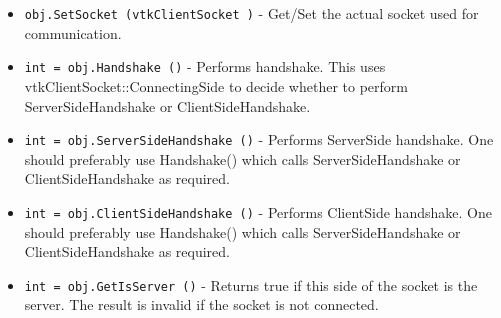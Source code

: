\begin{itemize}
\item  \verb|obj.SetSocket (vtkClientSocket )| -  Get/Set the actual socket used for communication.

\item  \verb|int = obj.Handshake ()| -  Performs handshake. This uses vtkClientSocket::ConnectingSide to decide
 whether to perform ServerSideHandshake or ClientSideHandshake. 

\item  \verb|int = obj.ServerSideHandshake ()| -  Performs ServerSide handshake.
 One should preferably use Handshake() which calls ServerSideHandshake or
 ClientSideHandshake as required.

\item  \verb|int = obj.ClientSideHandshake ()| -  Performs ClientSide handshake.
 One should preferably use Handshake() which calls ServerSideHandshake or
 ClientSideHandshake as required.

\item  \verb|int = obj.GetIsServer ()| -  Returns true if this side of the socket is the server.  The result
 is invalid if the socket is not connected.

\end{itemize}
